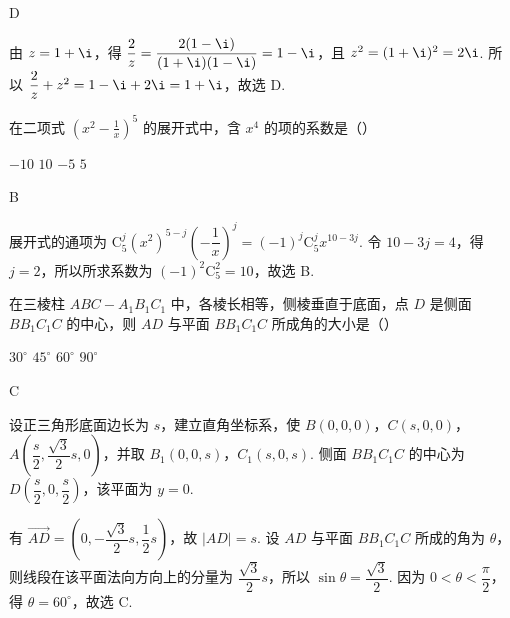 \begin{answer}
D
\end{answer}

\begin{solution}
由 \(z=1+\i\)，得 \(\dfrac{2}{z}=\dfrac{2(1-\i)}{(1+\i)(1-\i)}=1-\i\)，且 \(z^2=(1+\i)^2=2\i\). 所以 \(\dfrac{2}{z}+z^2=1-\i+2\i=1+\i\)，故选 D.
\end{solution}

\begin{problem}
在二项式 \(\left(x^2-\frac{1}{x}\right)^5\) 的展开式中，含 \(x^4\) 的项的系数是（\quad）

\choices
    {\(-10\)}
    {\(10\)}
    {\(-5\)}
    {\(5\)}
\end{problem}

\begin{answer}
B
\end{answer}

\begin{solution}
展开式的通项为 \(\mathrm C_5^j(x^2)^{5-j}\left(-\dfrac1x\right)^j=(-1)^j\mathrm C_5^j x^{10-3j}\). 令 \(10-3j=4\)，得 \(j=2\)，所以所求系数为 \((-1)^2\mathrm C_5^2=10\)，故选 B.
\end{solution}

\begin{problem}
在三棱柱 \(ABC-A_1B_1C_1\) 中，各棱长相等，侧棱垂直于底面，点 \(D\) 是侧面 \(BB_1C_1C\) 的中心，则 \(AD\) 与平面 \(BB_1C_1C\) 所成角的大小是（\quad）

\choices
    {\(30^\circ\)}
    {\(45^\circ\)}
    {\(60^\circ\)}
    {\(90^\circ\)}
\end{problem}

\begin{answer}
C
\end{answer}

\begin{solution}
设正三角形底面边长为 \(s\)，建立直角坐标系，使 \(B(0,0,0)\)，\(C(s,0,0)\)，\(A\left(\dfrac{s}{2},\dfrac{\sqrt3}{2}s,0\right)\)，并取 \(B_1(0,0,s)\)，\(C_1(s,0,s)\). 侧面 \(BB_1C_1C\) 的中心为 \(D\left(\dfrac{s}{2},0,\dfrac{s}{2}\right)\)，该平面为 \(y=0\).

有 \(\overrightarrow{AD}=\left(0,-\dfrac{\sqrt3}{2}s,\dfrac12s\right)\)，故 \(|AD|=s\). 设 \(AD\) 与平面 \(BB_1C_1C\) 所成的角为 \(\theta\)，则线段在该平面法向方向上的分量为 \(\dfrac{\sqrt3}{2}s\)，所以 \(\sin\theta=\dfrac{\sqrt3}{2}\). 因为 \(0<\theta<\dfrac\pi2\)，得 \(\theta=60^\circ\)，故选 C.
\end{solution}

